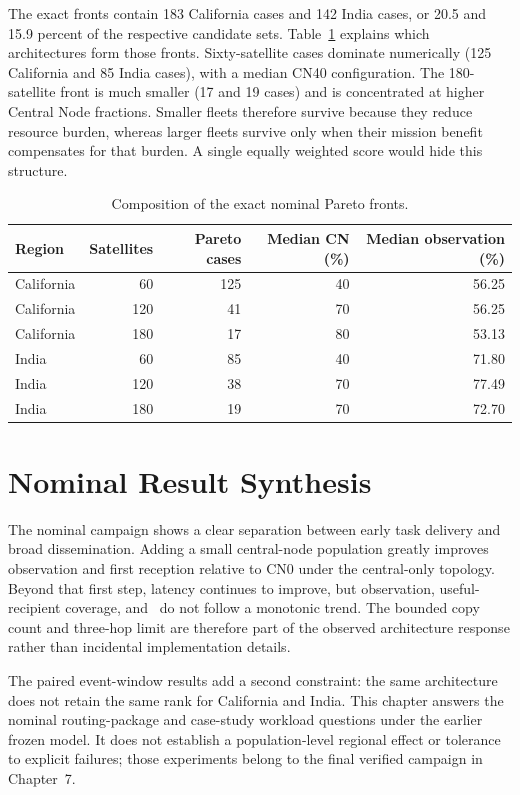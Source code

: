 The exact fronts contain 183 California cases and 142 India cases, or 20.5 and 15.9 percent of the respective candidate sets. Table~\ref{tab:nominal_pareto_composition} explains which architectures form those fronts. Sixty-satellite cases dominate numerically (125 California and 85 India cases), with a median CN40 configuration. The 180-satellite front is much smaller (17 and 19 cases) and is concentrated at higher Central Node fractions. Smaller fleets therefore survive because they reduce resource burden, whereas larger fleets survive only when their mission benefit compensates for that burden. A single equally weighted score would hide this structure.

\begin{table}[htbp]
\centering
\small
\caption{Composition of the exact nominal Pareto fronts.}
\label{tab:nominal_pareto_composition}
\begin{tabular}{lrrrr}
\toprule
Region & Satellites & Pareto cases & Median CN (\%) & Median observation (\%) \\
\midrule
California & 60 & 125 & 40 & 56.25 \\
California & 120 & 41 & 70 & 56.25 \\
California & 180 & 17 & 80 & 53.13 \\
India & 60 & 85 & 40 & 71.80 \\
India & 120 & 38 & 70 & 77.49 \\
India & 180 & 19 & 70 & 72.70 \\
\bottomrule
\end{tabular}
\end{table}

\section{Nominal Result Synthesis}

The nominal campaign shows a clear separation between early task delivery and broad dissemination. Adding a small central-node population greatly improves observation and first reception relative to CN0 under the central-only topology. Beyond that first step, latency continues to improve, but observation, useful-recipient coverage, and \Suseful\ do not follow a monotonic trend. The bounded copy count and three-hop limit are therefore part of the observed architecture response rather than incidental implementation details.

The paired event-window results add a second constraint: the same architecture does not retain the same rank for California and India. This chapter answers the nominal routing-package and case-study workload questions under the earlier frozen model. It does not establish a population-level regional effect or tolerance to explicit failures; those experiments belong to the final verified campaign in Chapter~7.
